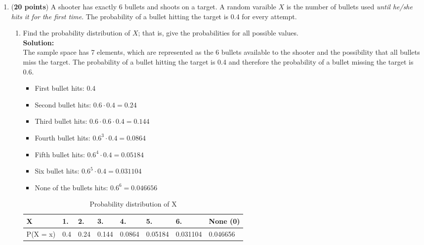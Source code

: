 \documentclass[a4paper]{article}
\begin{document}
\begin{enumerate}


\item (\textbf{20 points}) A shooter has exactly 6 bullets and shoots on a target. A random varaible $X$ is the number of bullets used \textit{until he/she hits it for the first time}. The probability of a bullet hitting the target is 0.4 for every attempt.


\begin{enumerate}
	\item Find the probability distribution of $X$; that is, give the probabilities for all possible values.\\
	\textbf{Solution:}\\
	
	
The sample space has 7 elements, which are represented as the 6 bullets available to the shooter and the possibility that all bullets miss the target. The probability of a bullet hitting the target is 0.4 and therefore the probability of a bullet missing the target is 0.6.\\	

\begin{itemize}
	\item First bullet hits: $0.4$
	\item Second bullet hits: $0.6 \cdot 0.4 = 0.24$
	\item Third bullet hits: $0.6 \cdot 0.6 \cdot 0.4 = 0.144$
	\item Fourth bullet hits: $0.6^3 \cdot 0.4= 0.0864$
	\item Fifth bullet hits: $0.6^4 \cdot 0.4 = 0.05184$
	\item Six bullet hits: $0.6^5 \cdot 0.4 = 0.031104$
	\item None of the bullets hits: $0.6^6 = 0.046656$
\end{itemize}

\newpage



\begin{table}[]
\centering
\caption{Probability distribution of X}
\label{my-label}
\begin{tabular}{|l|l|l|l|l|l|l|l|}
\hline
X & 1. & 2. & 3. & 4. & 5. & 6. & None (0)\\ \hline
P(X = x) & 0.4 & 0.24 & 0.144 & 0.0864 & 0.05184 & 0.031104 & 0.046656\\ \hline
\end{tabular}
\end{table}




\end{enumerate}
\end{enumerate}
\end{document}
